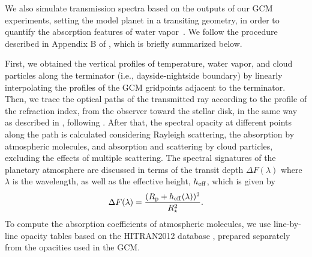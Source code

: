 \documentclass[11pt,numberedappendix,twocolappendix,]{emulateapj}
\newcommand{\dsa}[1]{{\color{blue}#1}}
\newcommand{\wv}{{\color{orange}water vapor\ }}
\begin{document}
We also simulate transmission spectra based on the outputs of our GCM experiments, setting the model planet in a transiting geometry, in order to quantify the absorption features of \wv.  
We follow the procedure described in Appendix B of \citet{Way2017}, which is briefly summarized below. 

First, we obtained the vertical profiles of temperature, water vapor, and cloud particles along the terminator (i.e., dayside-nightside boundary) by linearly interpolating the profiles of the GCM gridpoints adjacent to the terminator. 
Then, we trace the optical paths of the transmitted ray according to the profile of the refraction index, from the observer toward the stellar disk, in the same way as described in \citet{vanderWerf2008}, following \citet{Misra2014}. 
After that, the spectral opacity at different points along the path is calculated considering Rayleigh scattering, the absorption by atmospheric molecules, and absorption and scattering by cloud particles, excluding the effects of multiple scattering. 
The spectral signatures of the planetary atmosphere are discussed in terms of the transit depth $\Delta F(\lambda )$ where $\lambda $ is the wavelength, as well as the effective height, $h_{\rm eff}$, which is given by
\begin{equation}
\Delta F(\lambda) = \frac{( R_{\rm p} + h_{\rm eff}(\lambda)  )^2}{R_{\star }^2}. 
\end{equation}
To compute the absorption coefficients of atmospheric molecules, we use line-by-line opacity tables based on the HITRAN2012 database \citep{Rothman2013}, prepared separately from the opacities used in the GCM. 

\end{document}
